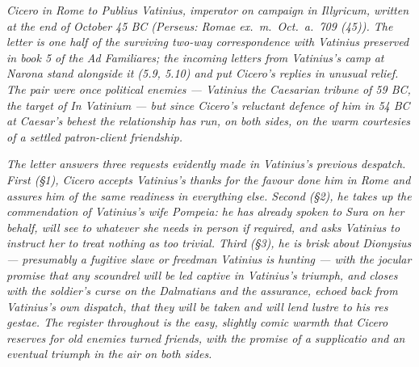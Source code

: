 
\textit{Cicero in Rome to Publius Vatinius, imperator on
campaign in Illyricum, written at the end of October 45 BC
(Perseus: \textit{Romae ex.~m.~Oct.~a.~709 (45)}). The letter
is one half of the surviving two-way correspondence with
Vatinius preserved in book 5 of the \textit{Ad Familiares}; the
incoming letters from Vatinius's camp at Narona stand alongside
it (5.9, 5.10) and put Cicero's replies in unusual relief.
The pair were once political enemies --- Vatinius the Caesarian
tribune of 59 BC, the target of \textit{In Vatinium} --- but
since Cicero's reluctant defence of him in 54 BC at Caesar's
behest the relationship has run, on both sides, on the warm
courtesies of a settled patron-client friendship.}

\textit{The letter answers three requests evidently made in
Vatinius's previous despatch. First (\S 1), Cicero accepts
Vatinius's thanks for the favour done him in Rome and assures
him of the same readiness in everything else. Second (\S 2), he
takes up the commendation of Vatinius's wife Pompeia: he has
already spoken to Sura on her behalf, will see to whatever she
needs in person if required, and asks Vatinius to instruct her
to treat nothing as too trivial. Third (\S 3), he is brisk
about Dionysius --- presumably a fugitive slave or freedman
Vatinius is hunting --- with the jocular promise that any
scoundrel will be led captive in Vatinius's triumph, and closes
with the soldier's curse on the Dalmatians and the assurance,
echoed back from Vatinius's own dispatch, that they will be
taken and will lend lustre to his \textit{res gestae}. The
register throughout is the easy, slightly comic warmth that
Cicero reserves for old enemies turned friends, with the
promise of a \textit{supplicatio} and an eventual triumph in
the air on both sides.}
